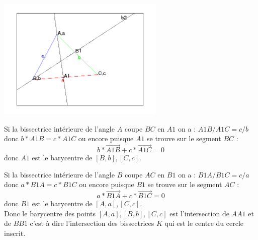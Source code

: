 \documentclass[a4paper,11pt]{book}
\begin{document}
\begin{center}\includegraphics[width=8cm]{inscrit2}\end{center}
Si la bissectrice int\'erieure de l'angle $A$ coupe $BC$ en $A1$ on a :
$A1B/A1C=c/b$ donc $b*A1B=c*A1C$ ou encore puisque $A1$ se trouve sur le 
segment $BC$ :
$$b*\overrightarrow{A1B}+c*\overrightarrow{A1C}=0$$
donc $A1$ est le barycentre de $[B,b],[C,c]$.

Si la bissectrice int\'erieure de l'angle $B$ coupe $AC$ en $B1$ on a :
$B1A/B1C=c/a$ donc $a*B1A=c*B1C$ ou encore puisque $B1$ se trouve sur le 
segment $AC$ :
$$a*\overrightarrow{B1A}+c*\overrightarrow{B1C}=0$$
donc $B1$ est le barycentre de $[A,a],[C,c]$.\\
Donc le barycentre des points $[A,a],[B,b],[C,c]$ est l'intersection de 
$AA1$ et de $BB1$ c'est \`a dire l'intersection des bissectrices $K$ 
qui est le centre du cercle inscrit.
\end{document}

